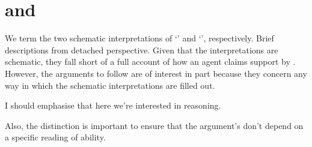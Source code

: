 \section{\AR{} and \WR{}}
\label{sec:ar-wr-1}

\begin{note}[\WR{} and \AR{}]
  We term the two schematic interpretations of  `\AR{}' and `\WR{}', respectively.
  Brief descriptions from detached perspective.
  Given that the interpretations are schematic, they fall short of a full account of how an agent claims support by .
  However, the arguments to follow are of interest in part because they concern any way in which the schematic interpretations are filled out.
\end{note}

{
  \color{red}
  I should emphasise that here we're interested in reasoning.

  Also, the distinction is important to ensure that the argument's don't depend on a specific reading of ability.
}

\subsection{\AR{}}
\label{sec:ar-1}

